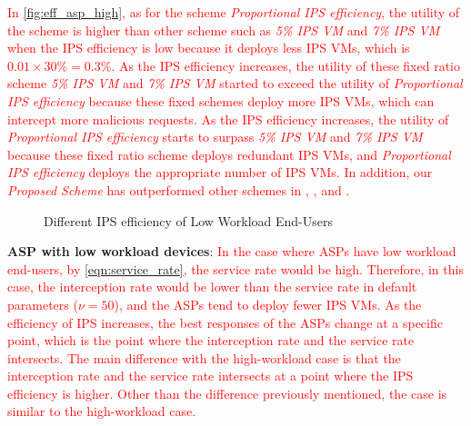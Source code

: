\documentclass[10pt,journal, compsoc]{IEEEtran}
\begin{document}
\textcolor{red}{
In \cref{fig:eff_asp_high}, as for the scheme \textit{Proportional IPS efficiency}, the utility of the scheme is higher than other scheme such as \textit{5\% IPS VM} and \textit{7\% IPS VM} when the IPS efficiency is low because it deploys less IPS VMs, which is $0.01 \times 30\% = 0.3\%$. As the IPS efficiency increases, the utility of these fixed ratio scheme \textit{5\% IPS VM} and \textit{7\% IPS VM} started to exceed the utility of \textit{Proportional IPS efficiency} because these fixed schemes deploy more IPS VMs, which can intercept more malicious requests. As the IPS efficiency increases, the utility of \textit{Proportional IPS efficiency} starts to surpass \textit{5\% IPS VM} and \textit{7\% IPS VM} because these fixed ratio scheme deploys redundant IPS VMs, and \textit{Proportional IPS efficiency} deploys the appropriate number of IPS VMs. In addition, our \textit{Proposed Scheme} has outperformed other schemes in , , and .}

\begin{figure}[!]
\captionsetup{justification=centering}
  \hfill
  \hfill
\label{fig:eff_low}
\caption{Different IPS efficiency of Low Workload End-Users}
\end{figure}

\textbf{ASP with low workload devices}:
\textcolor{red}{
In the case where ASPs have low workload end-users, by \cref{eqn:service_rate}, the service rate would be high. Therefore, in this case, the interception rate would be lower than the service rate in default parameters ($\nu = 50$), and the ASPs tend to deploy fewer IPS VMs. As the efficiency of IPS increases, the best responses of the ASPs change at a specific point, which is the point where the interception rate and the service rate intersects. The main difference with the high-workload case is that the interception rate and the service rate intersects at a point where the IPS efficiency is higher. Other than the difference previously mentioned, the case is similar to the high-workload case.}
\end{document}
